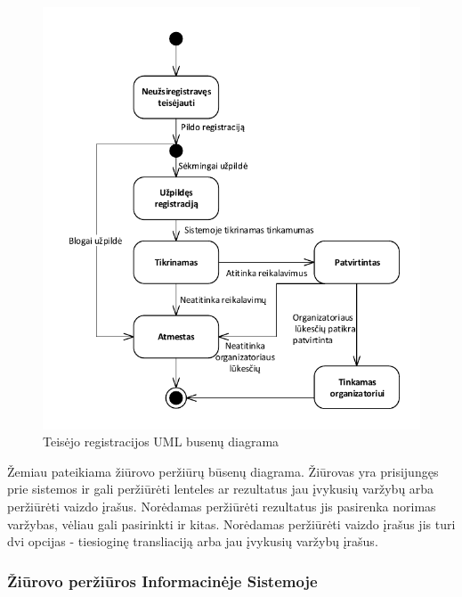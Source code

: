 \documentclass{VUMIFPSkursinis}
\begin{document}
		\begin{figure}[H]
			\centering
			\includegraphics[width=\textwidth]{img/BusenuDiagrama2}
			\caption{Teisėjo registracijos UML busenų diagrama}
			\label{fig:TeisejoRegistracijosUMLBusenuDiagrama}
		\end{figure}
		
		Žemiau pateikiama žiūrovo peržiūrų būsenų diagrama. 
		Žiūrovas yra prisijungęs prie sistemos ir gali peržiūrėti lenteles ar rezultatus jau įvykusių varžybų arba peržiūrėti vaizdo įrašus. 
		Norėdamas peržiūrėti rezultatus jis pasirenka norimas varžybas, vėliau gali pasirinkti ir kitas. 
		Norėdamas peržiūrėti vaizdo įrašus jis turi dvi opcijas - tiesioginę transliaciją arba jau įvykusių varžybų įrašus.
		
		\subsubsection*{Žiūrovo peržiūros Informacinėje Sistemoje}
		
\end{document}
